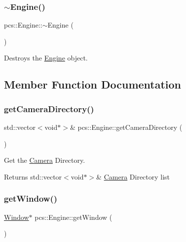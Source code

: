 \subsubsection{\texorpdfstring{$\sim$\+Engine()}{~Engine()}}
{\footnotesize\ttfamily pcs\+::\+Engine\+::$\sim$\+Engine (\begin{DoxyParamCaption}{ }\end{DoxyParamCaption})}



Destroys the \hyperlink{classpcs_1_1Engine}{Engine} object. 



\subsection{Member Function Documentation}
\mbox{\label{classpcs_1_1Engine_a71059ef96479c7ca59901bfa0be2587a}} 
\subsubsection{\texorpdfstring{get\+Camera\+Directory()}{getCameraDirectory()}}
{\footnotesize\ttfamily std\+::vector$<$void$\ast$$>$\& pcs\+::\+Engine\+::get\+Camera\+Directory (\begin{DoxyParamCaption}{ }\end{DoxyParamCaption})\hspace{0.3cm}{\ttfamily [inline]}}



Get the \hyperlink{classpcs_1_1Camera}{Camera} Directory. 

\begin{DoxyReturn}{Returns}
std\+::vector$<$void$\ast$$>$\& \hyperlink{classpcs_1_1Camera}{Camera} Directory list 
\end{DoxyReturn}
\mbox{\label{classpcs_1_1Engine_a3bf8432ad5c397ea7bb3f95728fa9792}} 
\subsubsection{\texorpdfstring{get\+Window()}{getWindow()}}
{\footnotesize\ttfamily \hyperlink{classpcs_1_1Window}{Window}$\ast$ pcs\+::\+Engine\+::get\+Window (\begin{DoxyParamCaption}{ }\end{DoxyParamCaption})\hspace{0.3cm}{\ttfamily [inline]}}



